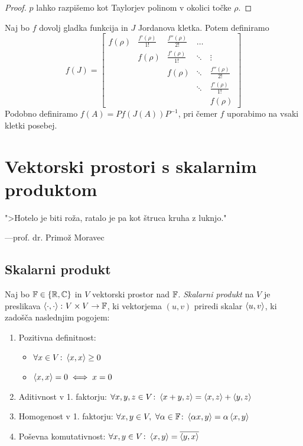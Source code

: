 \documentclass[12pt, a4paper]{article}
\begin{document}
\begin{proof}
$p$ lahko razpišemo kot Taylorjev polinom v okolici točke $\rho$.
\end{proof}

\begin{definicija}
Naj bo $f$ dovolj gladka funkcija in $J$ Jordanova kletka. Potem definiramo
\[
f(J)=\begin{bmatrix}
f(\rho) & \frac{f'(\rho)}{1!} & \frac{f''(\rho)}{2!} & \dots & \\ 
 & f(\rho) & \frac{f'(\rho)}{1!} & \ddots & \vdots \\ 
 & & f(\rho) & \ddots & \frac{f''(\rho)}{2!} \\ 
 & & & \ddots & \frac{f'(\rho)}{1!} \\ 
 & & & & f(\rho)
\end{bmatrix} 
\]
Podobno definiramo $f(A)=Pf(J(A))P^{-1}$, pri čemer $f$ uporabimo na vsaki kletki posebej.
\end{definicija}

\newpage

\section{Vektorski prostori s skalarnim produktom}

\epigraph{">Hotelo je biti roža, ratalo je pa kot štruca kruha z luknjo."}{---prof. dr. Primož Moravec}

\subsection{Skalarni produkt}

\begin{okvir}
\begin{definicija}
Naj bo $\mathbb{F}\in\left\{\mathbb{R},\mathbb{C}\right\}$ in $V$ vektorski prostor nad $\mathbb{F}$. \emph{Skalarni produkt} na $V$ je preslikava $\left\langle \cdot,\cdot\right\rangle\colon V\times V\to\mathbb{F}$, ki vektorjema $(u,v)$ priredi skalar $\left\langle u,v\right\rangle$, ki zadošča naslednjim pogojem:

\begin{enumerate}[label=\roman*)]
\item  Pozitivna definitnost:

\begin{itemize}
\item $\forall x\in V\colon \left\langle x,x\right\rangle\geq 0$
\item $\left\langle x,x\right\rangle=0\iff x=0$\end{itemize}

\item Aditivnost v 1. faktorju: $\forall x,y,z\in V\colon \left\langle x+y,z\right\rangle=\left\langle x,z\right\rangle+\left\langle y,z\right\rangle$
\item Homogenost v 1. faktorju: $\forall x,y\in V,~\forall\alpha\in\mathbb{F}\colon \left\langle \alpha x,y\right\rangle=\alpha\left\langle x,y\right\rangle$
\item Poševna komutativnost: $\forall x,y\in V\colon \left\langle x,y\right\rangle=\overline{\left\langle y,x\right\rangle}$
\end{enumerate}
\end{definicija}
\end{okvir}
\end{document}

